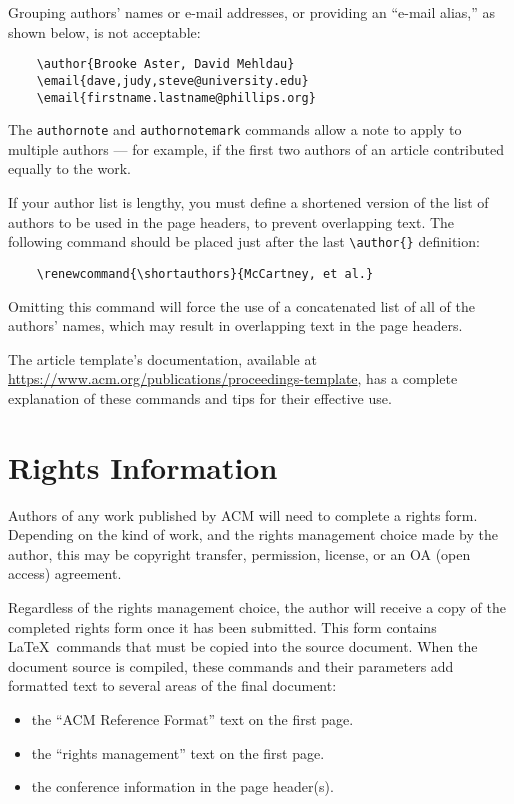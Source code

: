 \documentclass[acmtog]{acmart}
\begin{document}
	Grouping authors' names or e-mail addresses, or providing an ``e-mail
	alias,'' as shown below, is not acceptable:
	\begin{verbatim}
	\author{Brooke Aster, David Mehldau}
	\email{dave,judy,steve@university.edu}
	\email{firstname.lastname@phillips.org}
	\end{verbatim}
	
	The \verb|authornote| and \verb|authornotemark| commands allow a note
	to apply to multiple authors --- for example, if the first two authors
	of an article contributed equally to the work.
	
	If your author list is lengthy, you must define a shortened version of
	the list of authors to be used in the page headers, to prevent
	overlapping text. The following command should be placed just after
	the last \verb|\author{}| definition:
	\begin{verbatim}
	\renewcommand{\shortauthors}{McCartney, et al.}
	\end{verbatim}
	Omitting this command will force the use of a concatenated list of all
	of the authors' names, which may result in overlapping text in the
	page headers.
	
	The article template's documentation, available at
	\url{https://www.acm.org/publications/proceedings-template}, has a
	complete explanation of these commands and tips for their effective
	use.
	
	\section{Rights Information}
	
	Authors of any work published by ACM will need to complete a rights
	form. Depending on the kind of work, and the rights management choice
	made by the author, this may be copyright transfer, permission,
	license, or an OA (open access) agreement.
	
	Regardless of the rights management choice, the author will receive a
	copy of the completed rights form once it has been submitted. This
	form contains \LaTeX\ commands that must be copied into the source
	document. When the document source is compiled, these commands and
	their parameters add formatted text to several areas of the final
	document:
	\begin{itemize}
		\item the ``ACM Reference Format'' text on the first page.
		\item the ``rights management'' text on the first page.
		\item the conference information in the page header(s).
	\end{itemize}
	
\end{document}
